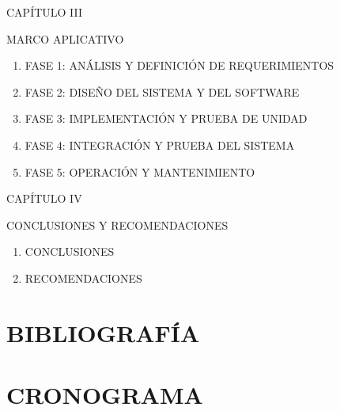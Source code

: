 \documentclass[12pt,letterpaper]{article}
\begin{document}
\noindent CAPÍTULO III

\noindent MARCO APLICATIVO

\begin{enumerate}[nosep, label=3.\arabic*., left = 0pt .. \parindent]
    \item FASE 1: ANÁLISIS Y DEFINICIÓN DE REQUERIMIENTOS
    \item FASE 2: DISEÑO DEL SISTEMA Y DEL SOFTWARE
    \item FASE 3: IMPLEMENTACIÓN Y PRUEBA DE UNIDAD
    \item FASE 4: INTEGRACIÓN Y PRUEBA DEL SISTEMA
    \item FASE 5: OPERACIÓN Y MANTENIMIENTO
\end{enumerate}

\noindent CAPÍTULO IV

\noindent CONCLUSIONES Y RECOMENDACIONES

\begin{enumerate}[nosep, label=4.\arabic*., left = 0pt .. \parindent]
    \item CONCLUSIONES
    \item RECOMENDACIONES
\end{enumerate}


\section{BIBLIOGRAFÍA}
\nocite{cuevas2023}
\printbibliography[heading=none]
\section{CRONOGRAMA}
\end{document}

